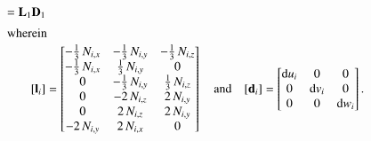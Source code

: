 \begin{subequations}
\begin{align}
	= \mathbf{L}_1 \mathbf{D}_1 \\
	\intertext{wherein}
	[\mathbf{l}_i] & = \begin{bmatrix} 
	-\tfrac{1}{3} \, N_{i,x} &  - \tfrac{1}{3} \, N_{i,y} & -\tfrac{1}{3} \, N_{i,z} \\
	-\tfrac{1}{3} \, N_{i,x} &  \tfrac{1}{3} \, N_{i,y} & 0 \\
	0  & -\tfrac{1}{3} \, N_{i,y} & \tfrac{1}{3} \, N_{i,z} \\
    0 &  - 2 \, N_{i,z}  &  2 \, N_{i,y} \\
    0 &  2 \, N_{i,z}  &  2 \, N_{i,y}  \\
	- 2 \,  N_{i,y} &  2 \, N_{i,x} & 0   \end{bmatrix}  \quad \text{and} \quad	[\mathbf{d}_i] = \begin{bmatrix}
	\mathrm{d} u_i & 0  & 0  \\
	0 &  \mathrm{d} v_i   & 0  \\
	0 & 0 & \mathrm{d} w_i \end{bmatrix} .
	\end{align}
\end{subequations}

